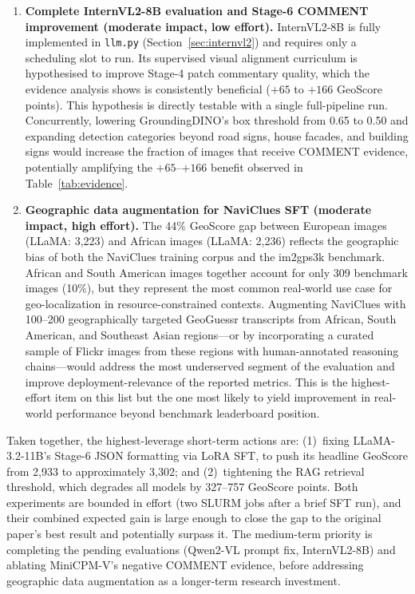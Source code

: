 \documentclass[11pt]{article}
\begin{document}
\begin{enumerate}
  \item \textbf{Complete InternVL2-8B evaluation and Stage-6 COMMENT improvement
    (moderate impact, low effort).}
    InternVL2-8B is fully implemented in \texttt{llm.py} (Section~\ref{sec:internvl2})
    and requires only a scheduling slot to run. Its supervised visual alignment curriculum
    is hypothesised to improve Stage-4 patch commentary quality, which the evidence
    analysis shows is consistently beneficial ($+65$ to $+166$ GeoScore points). This
    hypothesis is directly testable with a single full-pipeline run. Concurrently,
    lowering GroundingDINO's box threshold from 0.65 to 0.50 and expanding detection
    categories beyond road signs, house facades, and building signs would increase the
    fraction of images that receive COMMENT evidence, potentially amplifying the
    $+65$--$+166$ benefit observed in Table~\ref{tab:evidence}.

  \item \textbf{Geographic data augmentation for NaviClues SFT (moderate impact,
    high effort).}
    The 44\% GeoScore gap between European images (LLaMA: 3{,}223) and African images
    (LLaMA: 2{,}236) reflects the geographic bias of both the NaviClues training corpus and the im2gps3k
    benchmark. African and South American images together account for only 309 benchmark
    images (10\%), but they represent the most common real-world use case for geo-localization
    in resource-constrained contexts. Augmenting NaviClues with 100--200 geographically
    targeted GeoGuessr transcripts from African, South American, and Southeast Asian
    regions---or by incorporating a curated sample of Flickr images from these regions
    with human-annotated reasoning chains---would address the most underserved segment
    of the evaluation and improve deployment-relevance of the reported metrics. This is
    the highest-effort item on this list but the one most likely to yield improvement in
    real-world performance beyond benchmark leaderboard position.

\end{enumerate}

Taken together, the highest-leverage short-term actions are: (1)~fixing
LLaMA-3.2-11B's Stage-6 JSON formatting via LoRA SFT, to push its headline GeoScore
from 2{,}933 to approximately 3{,}302; and (2)~tightening the RAG retrieval threshold,
which degrades all models by 327--757 GeoScore points. Both experiments are bounded
in effort (two SLURM jobs after a brief SFT run), and their combined expected gain is
large enough to close the gap to the original paper's best result and potentially
surpass it. The medium-term priority is completing the pending evaluations (Qwen2-VL
prompt fix, InternVL2-8B) and ablating MiniCPM-V's negative COMMENT evidence, before
addressing geographic data augmentation as a longer-term research investment.



\end{document}
